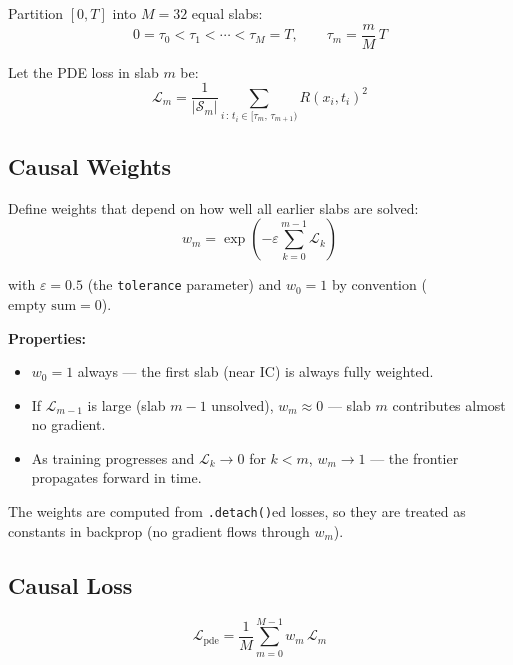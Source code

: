 \documentclass[11pt, a4paper]{article}
\begin{document}
Partition $[0, T]$ into $M = 32$ equal slabs:
\begin{equation}
  0 = \tau_0 < \tau_1 < \cdots < \tau_M = T,
  \qquad
  \tau_m = \frac{m}{M}\,T
\end{equation}

Let the PDE loss in slab $m$ be:
\begin{equation}
  \mathcal{L}_m
  = \frac{1}{|\mathcal{S}_m|}
    \sum_{i\,:\,t_i \in [\tau_m,\,\tau_{m+1})} R(x_i, t_i)^2
  \label{eq:chunk_loss}
\end{equation}

\subsection{Causal Weights}

Define weights that depend on how well all earlier slabs are solved:
\begin{equation}
  \boxed{
    w_m = \exp\!\left(-\varepsilon \sum_{k=0}^{m-1} \mathcal{L}_k\right)
  }
  \label{eq:causal_weights}
\end{equation}

with $\varepsilon = 0.5$ (the \texttt{tolerance} parameter) and $w_0 = 1$
by convention ($\text{empty sum} = 0$).

\textbf{Properties:}
\begin{itemize}
  \item $w_0 = 1$ always — the first slab (near IC) is always fully weighted.
  \item If $\mathcal{L}_{m-1}$ is large (slab $m{-}1$ unsolved),
        $w_m \approx 0$ — slab $m$ contributes almost no gradient.
  \item As training progresses and $\mathcal{L}_k \to 0$ for $k < m$,
        $w_m \to 1$ — the frontier propagates forward in time.
\end{itemize}

The weights are computed from \texttt{.detach()}ed losses, so they are
treated as constants in backprop (no gradient flows through $w_m$).

\subsection{Causal Loss}

\begin{equation}
  \mathcal{L}_{\mathrm{pde}}
  = \frac{1}{M}\sum_{m=0}^{M-1} w_m\,\mathcal{L}_m
  \label{eq:causal_loss}
\end{equation}
\end{document}
